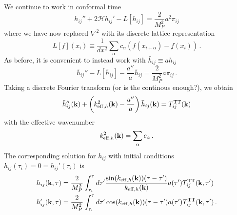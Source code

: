 \documentclass{revtex4}
\begin{document}
We continue to work in conformal time
\begin{equation}
  h_{ij}'' + 2\mathcal{H}h_{ij}' - L[h_{ij}] = \frac{2}{M_P^2}a^2\pi_{ij}
\end{equation}
where we have now replaced $\nabla^2$ with its discrete lattice representation
\begin{equation}
  L[f](x_i) \equiv \frac{1}{dx^2}\sum_\alpha c_{\alpha}\left(f(x_{i+\alpha})-f(x_i)\right) \, .
\end{equation}
As before, it is convenient to instead work with $\bar{h}_{ij} \equiv ah_{ij}$
\begin{equation}
  \bar{h}_{ij}'' - L[\bar{h}_{ij}] - \frac{a''}{a}\bar{h}_{ij} = \frac{2}{M_P^2}a\pi_{ij} \, .
\end{equation}
Taking a discrete Fourier transform (or is the continous enough?), we obtain
\begin{equation}
  \bar{h}_{ij}''({\bf k}) + \left(k_{{\rm eff},h}^2({\bf k}) -\frac{a''}{a}\right) \bar{h}_{ij}({\bf k}) = T_{ij}^{{\rm TT}}({\bf k}) 
\end{equation}
with the effective wavenumber
\begin{equation}
  k_{{\rm eff},h}^2({\bf k}) = \sum_\alpha c_\alpha \, .
\end{equation}
The corresponding solution for $h_{ij}$ with initial conditions $h_{ij}(\tau_i) = 0 = h_{ij}'(\tau_i)$ is
\begin{subequations}
\begin{align}
  h_{ij}({\bf k},\tau) &= \frac{2}{M_P^2}\int_{\tau_i}^\tau d\tau' \frac{\sin(k_{{\rm eff},h}({\bf k}))(\tau-\tau')}{k_{{\rm eff},h}({\bf k})}a(\tau')T_{ij}^{{\rm TT}}({\bf k},\tau') \\
  h'_{ij}({\bf k},\tau) &= \frac{2}{M_P^2}\int_{\tau_i}^\tau d\tau' \cos(k_{{\rm eff},h}({\bf k}))(\tau-\tau')a(\tau')T_{ij}^{{\rm TT}}({\bf k},\tau') \, .
\end{align}
\end{subequations}
\end{document}
